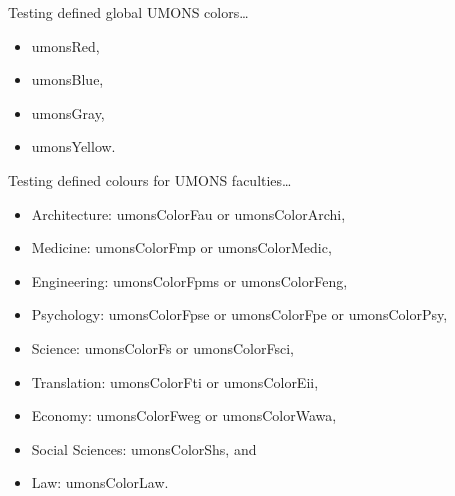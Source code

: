 \documentclass{minimal}
\begin{document}
	Testing defined global UMONS colors\ldots
	\begin{itemize}
		\item \textcolor{umonsRed}{umonsRed},
		\item \textcolor{umonsBlue}{umonsBlue},
		\item \textcolor{umonsGray}{umonsGray},
		\item \textcolor{umonsYellow}{umonsYellow}.
	\end{itemize}
	
	Testing defined colours for UMONS faculties\ldots
	\begin{itemize}
		\item Architecture: \textcolor{umonsColorFau}{umonsColorFau} or \textcolor{umonsColorArchi}{umonsColorArchi},
		\item Medicine: \textcolor{umonsColorFmp}{umonsColorFmp} or \textcolor{umonsColorMedic}{umonsColorMedic},
		\item Engineering: \textcolor{umonsColorFpms}{umonsColorFpms} or \textcolor{umonsColorFeng}{umonsColorFeng},
		\item Psychology: \textcolor{umonsColorFpse}{umonsColorFpse} or \textcolor{umonsColorFpe}{umonsColorFpe} or \textcolor{umonsColorPsy}{umonsColorPsy},
		\item Science: \textcolor{umonsColorFs}{umonsColorFs} or \textcolor{umonsColorFsci}{umonsColorFsci},
		\item Translation: \textcolor{umonsColorFti}{umonsColorFti} or \textcolor{umonsColorEii}{umonsColorEii},
		\item Economy: \textcolor{umonsColorFweg}{umonsColorFweg} or \textcolor{umonsColorWawa}{umonsColorWawa},
		\item Social Sciences: \textcolor{umonsColorShs}{umonsColorShs}, and
		\item Law: \textcolor{umonsColorLaw}{umonsColorLaw}.
	\end{itemize}
\end{document}
